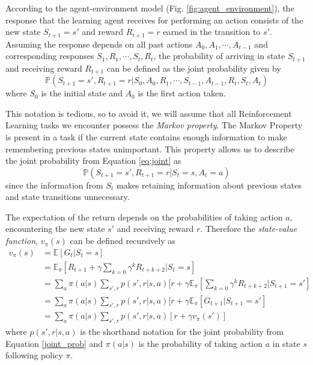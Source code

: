 \documentclass[11pt]{article}
\begin{document}
According to the agent-environment model (Fig. \ref{fig:agent_environment}), the response that
the learning agent receives for performing an action consists
of the new state $S_{t+1} = s'$ and reward $R_{t+1} = r$ earned in the transition
to $s'$.
Assuming the response depends on all past actions $A_{0}, A_{1}, \cdots, A_{t-1}$ and
corresponding responses $S_{1}, R_{1}, \cdots, S_{t}, R_{t}$, the probability
of arriving in state $S_{t+1}$ and receiving reward $R_{t+1}$ can be defined as the
joint probability given by
\begin{equation}\label{eq:joint}
    \mathds{P}(S_{t+1} = s', R_{t+1} = r | S_0, A_0, R_1, \cdots, S_{t-1}, A_{t-1}, R_{t}, S_{t}, A_{t})
\end{equation}
where $S_0$ is the initial state and $A_0$ is the first action taken.

This notation is tedious, so to avoid it, we will assume that all Reinforcement Learning tasks
we encounter possess the \textit{Markov property}.
The Markov Property is present in a task if the current state contains
enough information to make remembering previous states unimportant.
This property allows us to describe the joint probability from Equation \ref{eq:joint}
as
\begin{equation}\label{joint_prob}
    \mathds{P}(S_{t+1} = s', R_{t+1} = r | S_t = s, A_t = a)
\end{equation}
since the information from $S_t$ makes retaining information about previous states
and state transitions unnecessary.

The expectation of the return depends on the probabilities of taking action $a$,
encountering the new state $s'$ and receiving reward $r$.
Therefore the \textit{state-value function}, $v_\pi(s)$ can be defined recursively as
\begin{equation}\label{eq:sv}
    \begin{aligned}
        v_\pi(s) &= \mathds{E}[ G_t | S_t = s]\\
        & = \mathds{E}_\pi[R_{t+1} + \gamma \sum\limits_{k=0} \gamma^k R_{t+k+2} | S_t = s]\\
        & = \sum\limits_{a} \pi(a|s) \sum\limits_{s', r} p(s', r | s, a) [r + \gamma \mathds{E}_\pi[\sum\limits_{k=0} \gamma^k R_{t+k+2} | S_{t+1} = s']\\
        & =  \sum\limits_{a} \pi(a|s) \sum\limits_{s', r} p(s', r | s, a) [r + \gamma \mathds{E}_\pi[G_{t+1} | S_{t+1} = s']\\
        & =   \sum\limits_{a} \pi(a|s) \sum\limits_{s', r} p(s', r | s, a) [r + \gamma v_\pi(s')]
    \end{aligned}
\end{equation}
where $p(s', r | s, a)$ is the shorthand notation for the joint probability from Equation \ref{joint_prob} and $\pi(a|s)$ is the
probability of taking action $a$ in state $s$ following policy $\pi$.

%
%
\end{document}
